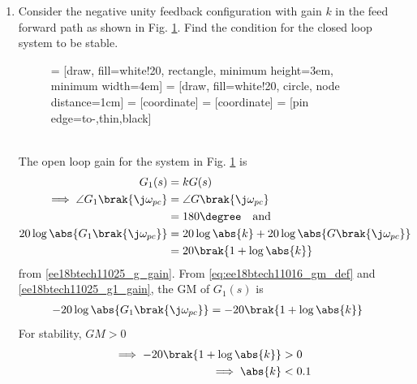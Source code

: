 \begin{enumerate}[label=\thesubsection.\arabic*.,ref=\thesubsection.\theenumi]
\item  Consider the negative unity feedback configuration with gain $k$ in the feed forward path as shown in Fig.     \ref{fig:ee18btech11025_bock}.  Find the condition for the closed loop system to be stable.
%
\begin{figure}[h]
 \centering
     = [draw, fill=white!20, rectangle, 
    minimum height=3em, minimum width=4em]
     = [draw, fill=white!20, circle, node distance=1cm]
     = [coordinate]
     = [coordinate]
     = [pin edge={to-,thin,black}]
    \caption{}
    \label{fig:ee18btech11025_bock}
\end{figure}
\\
\solution The open loop gain for the system in    Fig.  \ref{fig:ee18btech11025_bock} is
%
    \begin{align}  
            G_1(s) &= kG(s)
\\
\implies \angle G_1\brak{\j\omega_{pc}}  &= \angle G\brak{\j\omega_{pc}}  
\\
&= 180 \degree \quad \text{and}
\\
 20\log\abs{ G_1\brak{\j\omega_{pc}}}  &= 20\log \abs{k }+20\log\abs{ G\brak{\j\omega_{pc}}}
\\
&= 20 \brak{1 + \log \abs{k }}
\label{ee18btech11025_g1_gain}
    \end{align}
from \eqref{ee18btech11025_g_gain}.  From \eqref{eq:ee18btech11016_gm_def} and \eqref{ee18btech11025_g1_gain}, the GM of $G_1(s)$ is
    \begin{align}  
-20\log \abs{ G_1\brak{\j\omega_{pc}}} &= -20 \brak{1 + \log \abs{k }}
    \end{align}
%
For stability, $GM > 0$
    \begin{align}  
\implies  -20 \brak{1 + \log \abs{k }} &> 0
\\
\implies  \abs{k} &< 0.1
    \end{align}
%

\end{enumerate}